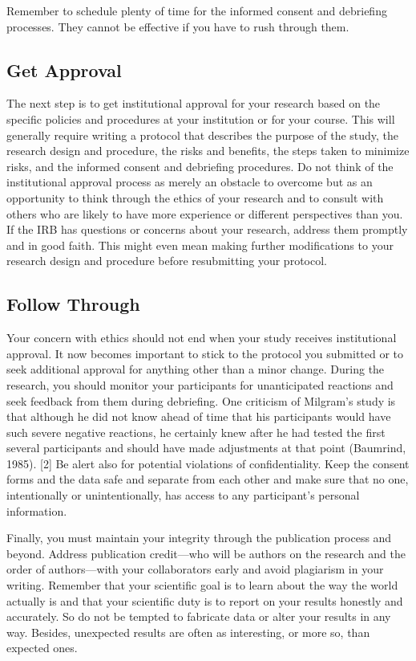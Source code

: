 Remember to schedule plenty of time for the informed consent and debriefing processes. They cannot be effective if you have to rush through them.

\subsection{Get Approval}

The next step is to get institutional approval for your research based on the specific policies and procedures at your institution or for your course. This will generally require writing a protocol that describes the purpose of the study, the research design and procedure, the risks and benefits, the steps taken to minimize risks, and the informed consent and debriefing procedures. Do not think of the institutional approval process as merely an obstacle to overcome but as an opportunity to think through the ethics of your research and to consult with others who are likely to have more experience or different perspectives than you. If the IRB has questions or concerns about your research, address them promptly and in good faith. This might even mean making further modifications to your research design and procedure before resubmitting your protocol.

\subsection{Follow Through}

Your concern with ethics should not end when your study receives institutional approval. It now becomes important to stick to the protocol you submitted or to seek additional approval for anything other than a minor change. During the research, you should monitor your participants for unanticipated reactions and seek feedback from them during debriefing. One criticism of Milgram's study is that although he did not know ahead of time that his participants would have such severe negative reactions, he certainly knew after he had tested the first several participants and should have made adjustments at that point (Baumrind, 1985). [2] Be alert also for potential violations of confidentiality. Keep the consent forms and the data safe and separate from each other and make sure that no one, intentionally or unintentionally, has access to any participant's personal information.

Finally, you must maintain your integrity through the publication process and beyond. Address publication credit---who will be authors on the research and the order of authors---with your collaborators early and avoid plagiarism in your writing. Remember that your scientific goal is to learn about the way the world actually is and that your scientific duty is to report on your results honestly and accurately. So do not be tempted to fabricate data or alter your results in any way. Besides, unexpected results are often as interesting, or more so, than expected ones.



